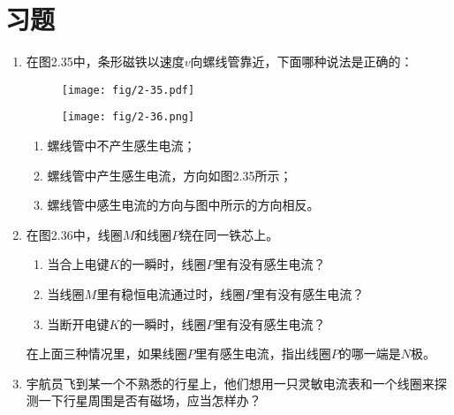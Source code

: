 \section*{习题}
\begin{enumerate}
    \item 在图2.35中，条形磁铁以速度$v$向螺线管靠近，下面哪种说法是正确的：

\begin{figure}[htp]
\centering
\begin{minipage}[t]{0.48\textwidth}
\centering
\texttt{[image: fig/2-35.pdf]}
\caption{}
\end{minipage}
\begin{minipage}[t]{0.48\textwidth}
\centering
\texttt{[image: fig/2-36.png]}
\caption{}
\end{minipage}
\end{figure}

    \begin{enumerate}
\item 螺线管中不产生感生电流；
\item 螺线管中产生感生电流，方向如图2.35所示；
\item 螺线管中感生电流的方向与图中所示的方向相反。
    \end{enumerate}
    
    \item 在图2.36中，线圈$M$和线圈$P$绕在同一铁芯上。
    \begin{enumerate}
        \item 当合上电键$K$的一瞬时，线圈$P$里有没有感生电流？
        \item 当线圈$M$里有稳恒电流通过时，线圈$P$里有没有感生电流？
        \item 当断开电键$K$的一瞬时，线圈$P$里有没有感生电流？
    \end{enumerate}
    在上面三种情况里，如果线圈$P$里有感生电流，指出线圈$P$的哪一端是$N$极。
    \item 宇航员飞到某一个不熟悉的行星上，他们想用一只灵敏电流表和一个线圈来探测一下行星周围是否有磁场，应当怎样办？
   

\end{enumerate}
